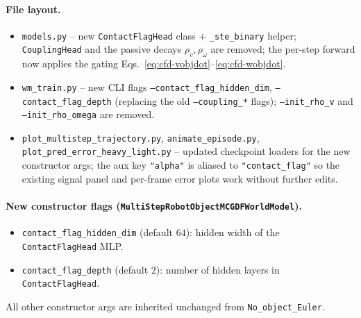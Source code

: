 \documentclass[11pt]{article}
\begin{document}
\paragraph{File layout.}
\begin{itemize}
  \item \texttt{models.py} -- new \texttt{ContactFlagHead} class +
    \texttt{\_ste\_binary} helper; \texttt{CouplingHead} and the
    passive decays $\rho_v, \rho_\omega$ are removed; the per-step
    forward now applies the gating
    Eqs.~\eqref{eq:cfd-vobjdot}--\eqref{eq:cfd-wobjdot}.
  \item \texttt{wm\_train.py} -- new CLI flags
    \texttt{--contact\_flag\_hidden\_dim},
    \texttt{--contact\_flag\_depth} (replacing the old
    \texttt{--coupling\_*} flags); \texttt{--init\_rho\_v} and
    \texttt{--init\_rho\_omega} are removed.
  \item \texttt{plot\_multistep\_trajectory.py},
    \texttt{animate\_episode.py},
    \texttt{plot\_pred\_error\_heavy\_light.py} -- updated checkpoint
    loaders for the new constructor args; the aux key
    \texttt{"alpha"} is aliased to \texttt{"contact\_flag"} so the
    existing signal panel and per-frame error plots work without
    further edits.
\end{itemize}

\paragraph{New constructor flags
(\texttt{MultiStepRobotObjectMCGDFWorldModel}).}
\begin{itemize}
  \item \texttt{contact\_flag\_hidden\_dim} (default $64$): hidden
    width of the \texttt{ContactFlagHead} MLP.
  \item \texttt{contact\_flag\_depth} (default $2$): number of hidden
    layers in \texttt{ContactFlagHead}.
\end{itemize}
All other constructor args are inherited unchanged from
\texttt{No\_object\_Euler}.
\end{document}
